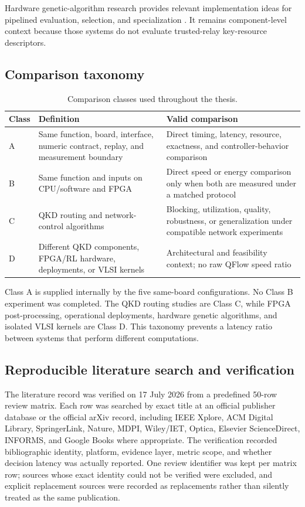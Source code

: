 Hardware genetic-algorithm research provides relevant implementation ideas for
pipelined evaluation, selection, and specialization
\cite{shackleford2001pipelined,tang2004hardware,fernando2010ga,
guo2014automated,peker2018ga}. It remains component-level context because those
systems do not evaluate trusted-relay key-resource descriptors.

\subsection{Comparison taxonomy}

\begin{table}[H]
\centering
\caption{Comparison classes used throughout the thesis.}
\label{tab:comparison-classes}
\begin{tabularx}{\textwidth}{@{}p{}p{}X@{}}
\toprule
\textbf{Class} & \textbf{Definition} & \textbf{Valid comparison}\\
\midrule
A & Same function, board, interface, numeric contract, replay, and measurement
boundary & Direct timing, latency, resource, exactness, and controller-behavior
comparison\\
B & Same function and inputs on CPU/software and FPGA & Direct speed or energy
comparison only when both are measured under a matched protocol\\
C & QKD routing and network-control algorithms & Blocking, utilization, quality,
robustness, or generalization under compatible network experiments\\
D & Different QKD components, FPGA/RL hardware, deployments, or VLSI kernels &
Architectural and feasibility context; no raw QFlow speed ratio\\
\bottomrule
\end{tabularx}
\end{table}

Class A is supplied internally by the five same-board configurations. No Class B
experiment was completed. The QKD routing studies are Class C, while FPGA
post-processing, operational deployments, hardware genetic algorithms, and isolated
VLSI kernels are Class D. This taxonomy prevents a latency ratio between systems that
perform different computations.

\subsection{Reproducible literature search and verification}

The literature record was verified on 17 July 2026 from a predefined 50-row review
matrix. Each row was searched by exact title at an official publisher database or
the official arXiv record, including IEEE Xplore, ACM Digital Library, SpringerLink,
Nature, MDPI, Wiley/IET, Optica, Elsevier ScienceDirect, INFORMS, and Google Books
where appropriate. The verification recorded bibliographic identity, platform,
evidence layer, metric scope, and whether decision latency was actually reported.
One review identifier was kept per matrix row; sources whose exact identity could not be
verified were excluded, and explicit replacement sources were recorded as
replacements rather than silently treated as the same publication.

